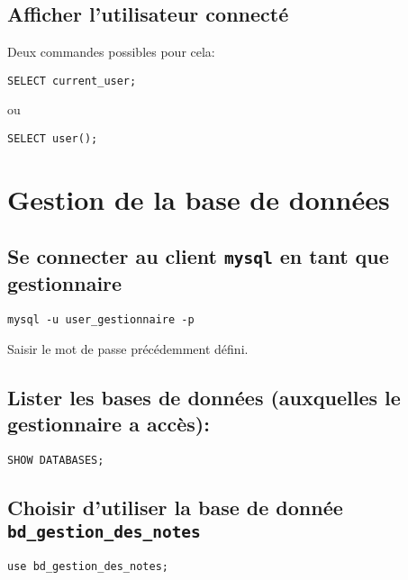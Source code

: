 \documentclass[11pt]{article}
\begin{document}
\subsection{Afficher l'utilisateur connecté}
\label{sec:orgcb42eb0}

Deux commandes possibles pour cela:
\begin{verbatim}
SELECT current_user;
\end{verbatim}

ou 

\begin{verbatim}
SELECT user();
\end{verbatim}


\section{Gestion de la base de données}
\label{sec:org87aa770}

\subsection{Se connecter au client \texttt{mysql} en tant que gestionnaire}
\label{sec:org5ba62e6}

\begin{verbatim}
mysql -u user_gestionnaire -p
\end{verbatim}

Saisir le mot de passe précédemment défini. 


\subsection{Lister les bases de données (auxquelles le gestionnaire a accès):}
\label{sec:orge98eb96}

\begin{verbatim}
SHOW DATABASES;
\end{verbatim}

\subsection{Choisir d'utiliser la base de donnée \texttt{bd\_gestion\_des\_notes}}
\label{sec:orgf05827b}

\begin{verbatim}
use bd_gestion_des_notes;      
\end{verbatim}
\end{document}

